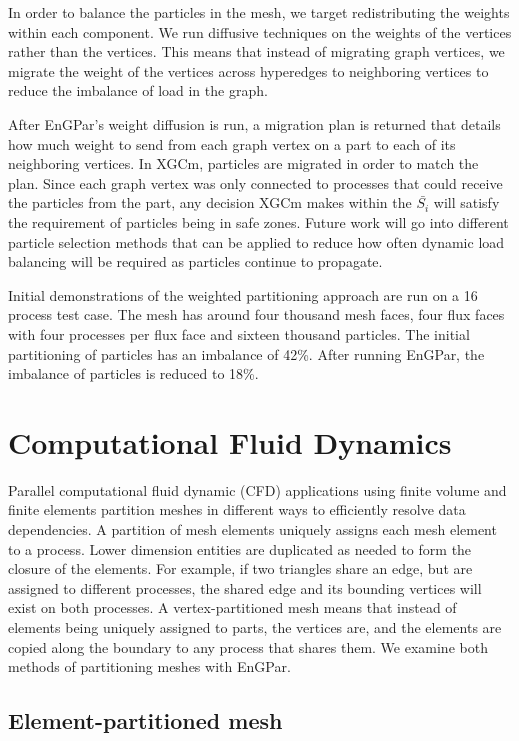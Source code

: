 \documentclass[conference]{IEEEtran}
\begin{document}
In order to balance the particles in the mesh, we target redistributing the weights within
each component. We run diffusive techniques on the weights of the vertices
rather than the vertices. This means that instead of migrating graph vertices, we migrate the
weight of the vertices across hyperedges to neighboring vertices to reduce the imbalance
of load in the graph.

After EnGPar's weight diffusion is run, a migration plan is returned that details how
much weight to send from each graph vertex on a part to each of its neighboring vertices.
In XGCm, particles are migrated in order to match the plan. Since each graph vertex was only
connected to processes that could receive the particles from the part, any decision XGCm makes
within the $\bar{S_i}$ will satisfy the requirement of particles being in safe zones. Future work
will go into different particle selection methods that can be applied to reduce how often
dynamic load balancing will be required as particles continue to propagate.

Initial demonstrations of the weighted partitioning approach are run on a 16
process test case. The mesh has around four thousand
mesh faces, four flux faces with four processes per flux face and sixteen thousand particles.
The initial partitioning of particles has an imbalance of 42\%. After running EnGPar, the
imbalance of particles is reduced to 18\%.

\section{Computational Fluid Dynamics}

Parallel computational fluid dynamic (CFD) applications using
finite volume and finite elements partition meshes in different
ways to efficiently resolve data dependencies.
A partition of mesh elements uniquely assigns each mesh element to a process.
Lower dimension entities are duplicated as needed to form the closure of the
elements.
For example, if two triangles share an edge, but are assigned to different
processes, the shared edge and its bounding vertices will exist on both
processes.
A vertex-partitioned mesh means that
instead of elements being uniquely assigned to parts, the vertices are, and the elements are
copied along the boundary to any process that shares them. We examine both methods of
partitioning meshes with EnGPar.

\subsection{Element-partitioned mesh}
\end{document}
